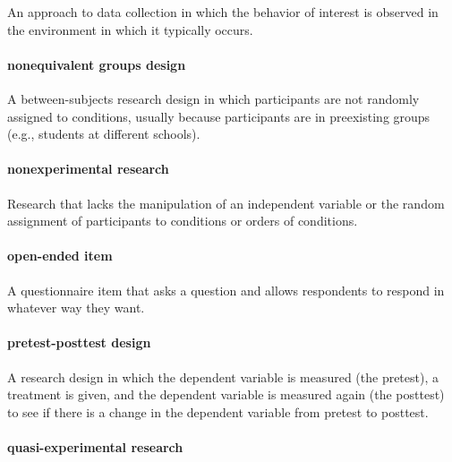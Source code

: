 \documentclass[
]{krantz}
\begin{document}
An approach to data collection in which the behavior of interest is observed in the environment in which it typically occurs.

\hypertarget{nonequivalent-groups-design-1}{%
\paragraph*{nonequivalent groups design}\label{nonequivalent-groups-design-1}}

A between-subjects research design in which participants are not randomly assigned to conditions, usually because participants are in preexisting groups (e.g., students at different schools).

\hypertarget{nonexperimental-research-1}{%
\paragraph*{nonexperimental research}\label{nonexperimental-research-1}}

Research that lacks the manipulation of an independent variable or the random assignment of participants to conditions or orders of conditions.

\hypertarget{open-ended-item}{%
\paragraph*{open-ended item}\label{open-ended-item}}

A questionnaire item that asks a question and allows respondents to respond in whatever way they want.

\hypertarget{pretest-posttest-design-1}{%
\paragraph*{pretest-posttest design}\label{pretest-posttest-design-1}}

A research design in which the dependent variable is measured (the pretest), a treatment is given, and the dependent variable is measured again (the posttest) to see if there is a change in the dependent variable from pretest to posttest.

\hypertarget{quasi-experimental-research-1}{%
\paragraph*{quasi-experimental research}\label{quasi-experimental-research-1}}
\end{document}
